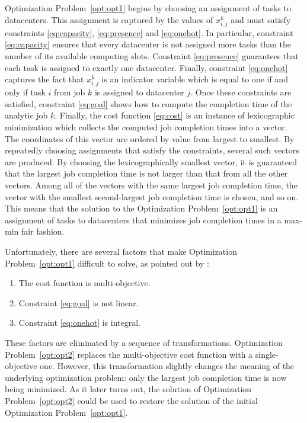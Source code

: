 Optimization Problem~\ref{opt:opt1} begins by choosing an assignment of tasks to datacenters. This assignment is captured by the values of \(x^k_{i, j}\) and must satisfy constraints \eqref{eq:capacity}, \eqref{eq:presence} and \eqref{eq:onehot}. In particular, constraint \eqref{eq:capacity} ensures that every datacenter is not assigned more tasks than the number of its available computing slots. Constraint \eqref{eq:presence} guarantees that each task is assigned to exactly one datacenter. Finally, constraint \eqref{eq:onehot} captures the fact that \(x^k_{i, j}\) is an indicator variable which is equal to one if and only if task \(i\) from job \(k\) is assigned to datacenter \(j\). Once these constraints are satisfied, constraint \eqref{eq:goal} shows how to compute the completion time of the analytic job \(k\). Finally, the cost function \eqref{eq:cost} is an instance of lexicographic minimization which collects the computed job completion times into a vector. The coordinates of this vector are ordered by value from largest to smallest. By repeatedly choosing assignments that satisfy the constraints, several such vectors are produced. By choosing the lexicographically smallest vector, it is guaranteed that the largest job completion time is not larger than that from all the other vectors. Among all of the vectors with the same largest job completion time, the vector with the smallest second-largest job completion time is chosen, and so on. This means that the solution to the Optimization Problem~\ref{opt:opt1} is an assignment of tasks to datacenters that minimizes job completion times in a max-min fair fashion.

Unfortunately, there are several factors that make Optimization Problem~\ref{opt:opt1} difficult to solve, as pointed out by \citet{Chen2017}:

\begin{enumerate}
\item The cost function is multi-objective.
\item Constraint \eqref{eq:goal} is not linear.
\item Constraint \eqref{eq:onehot} is integral.
\end{enumerate}

These factors are eliminated by a sequence of transformations. Optimization Problem~\ref{opt:opt2} replaces the multi-objective cost function with a single-objective one. However, this transformation slightly changes the meaning of the underlying optimization problem: only the largest job completion time is now being minimized. As it later turns out, the solution of Optimization Problem~\ref{opt:opt2} could be used to restore the solution of the initial Optimization Problem~\ref{opt:opt1}.

